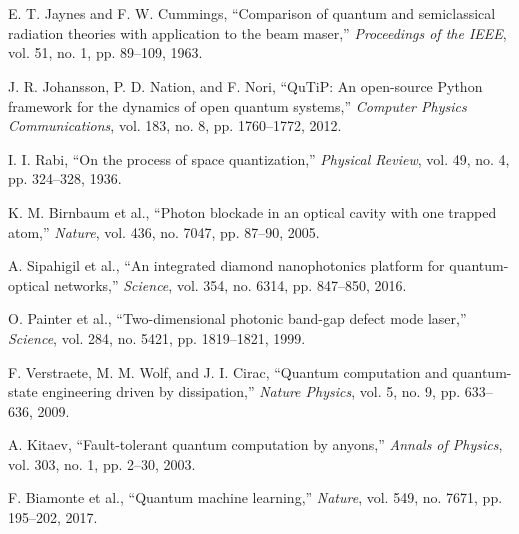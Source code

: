 \documentclass[conference]{IEEEtran}
\begin{document}
\section*{}

\begin{thebibliography}{99}
     E. T. Jaynes and F. W. Cummings, ``Comparison of quantum and semiclassical radiation theories with application to the beam maser,'' \textit{Proceedings of the IEEE}, vol. 51, no. 1, pp. 89--109, 1963.
    
     J. R. Johansson, P. D. Nation, and F. Nori, ``QuTiP: An open-source Python framework for the dynamics of open quantum systems,'' \textit{Computer Physics Communications}, vol. 183, no. 8, pp. 1760--1772, 2012.

     I. I. Rabi, ``On the process of space quantization,'' \textit{Physical Review}, vol. 49, no. 4, pp. 324--328, 1936.

     K. M. Birnbaum et al., ``Photon blockade in an optical cavity with one trapped atom,'' \textit{Nature}, vol. 436, no. 7047, pp. 87--90, 2005.

     A. Sipahigil et al., ``An integrated diamond nanophotonics platform for quantum-optical networks,'' \textit{Science}, vol. 354, no. 6314, pp. 847--850, 2016.

     O. Painter et al., ``Two-dimensional photonic band-gap defect mode laser,'' \textit{Science}, vol. 284, no. 5421, pp. 1819--1821, 1999.

     F. Verstraete, M. M. Wolf, and J. I. Cirac, ``Quantum computation and quantum-state engineering driven by dissipation,'' \textit{Nature Physics}, vol. 5, no. 9, pp. 633--636, 2009.

     A. Kitaev, ``Fault-tolerant quantum computation by anyons,'' \textit{Annals of Physics}, vol. 303, no. 1, pp. 2--30, 2003.

     F. Biamonte et al., ``Quantum machine learning,'' \textit{Nature}, vol. 549, no. 7671, pp. 195--202, 2017.
\end{thebibliography}
\end{document}
